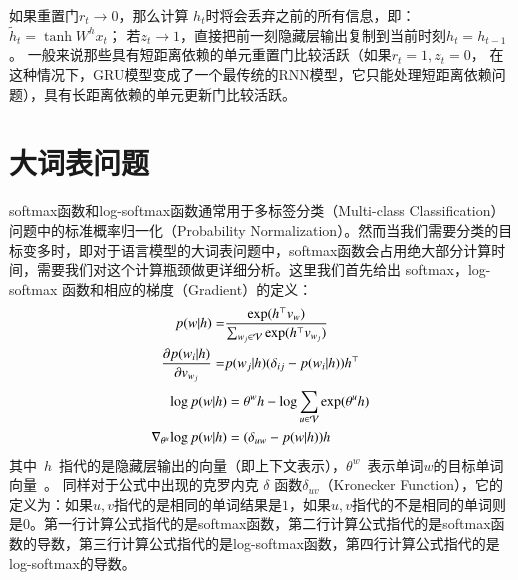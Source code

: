 如果重置门$r_t \to 0$，那么计算 $h_t$时将会丢弃之前的所有信息，即：$\tilde h_t=\tanh W^h x_t$； 若$z_t\to 1$，直接把前一刻隐藏层输出复制到当前时刻$ h_t =h_{t-1}$。 一般来说那些具有短距离依赖的单元重置门比较活跃（如果$r_t=1,z_t=0$， 在这种情况下，GRU模型变成了一个最传统的RNN模型，它只能处理短距离依赖问题），具有长距离依赖的单元更新门比较活跃。



\section{大词表问题}
softmax函数和log-softmax函数通常用于多标签分类（Multi-class Classification）问题中的标准概率归一化（Probability Normalization）。然而当我们需要分类的目标变多时，即对于语言模型的大词表问题中，softmax函数会占用绝大部分计算时间，需要我们对这个计算瓶颈做更详细分析。这里我们首先给出 softmax，log-softmax 函数和相应的梯度（Gradient）的定义：
\begin{equation}\label{eq:softmax}
\setlength{\abovedisplayskip}{6pt}
\setlength{\belowdisplayskip}{6pt}
\begin{split}
p(w|h)=&\frac{\exp(h^\top v_{w})}{\sum_{w_j\in \mathcal{V}}{\exp(h^\top v_{w_j} )}} \\
\frac{\partial p(w_i|h)}{\partial v_{w_j}}=&p(w_j|h)(\delta_{ij}-p(w_i|h))h^\top\\
\end{split}
\end{equation}
\begin{equation}
\label{eq:log-softmax}
\setlength{\abovedisplayskip}{6pt}
\setlength{\belowdisplayskip}{6pt}
\begin{split}
\log p(w|h) &= \theta^w h-\log \sum_{u\in \mathcal{V}}{\exp(\theta^u h)}\\
\nabla_{\theta^u}{\log p(w|h)}&= (\delta_{uw}-p(w|h))h
\end{split}
\end{equation}
其中~$h$~指代的是隐藏层输出的向量（即上下文表示），$\theta^w$~表示单词$w$的目标单词向量~。 同样对于公式中出现的克罗内克 $\delta$ 函数$ \delta_{uv}$（Kronecker Function），它的定义为：如果$ u,v $指代的是相同的单词结果是$ 1 $，如果$ u,v $指代的不是相同的单词则是$ 0 $。第一行计算公式指代的是softmax函数，第二行计算公式指代的是softmax函数的导数，第三行计算公式指代的是log-softmax函数，第四行计算公式指代的是log-softmax的导数。


